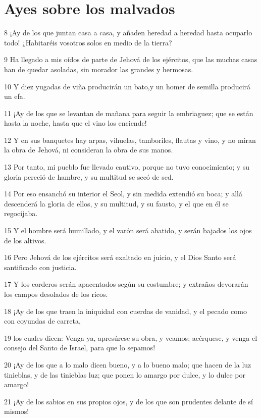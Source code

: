 \section*{Ayes sobre los malvados}

\par 8 ¡Ay de los que juntan casa a casa, y añaden heredad a heredad hasta ocuparlo todo! ¿Habitaréis vosotros solos en medio de la tierra?
\par 9 Ha llegado a mis oídos de parte de Jehová de los ejércitos, que las muchas casas han de quedar asoladas, sin morador las grandes y hermosas.
\par 10 Y diez yugadas de viña producirán un bato,y un homer de semilla producirá un efa.
\par 11 ¡Ay de los que se levantan de mañana para seguir la embriaguez; que se están hasta la noche, hasta que el vino los enciende!
\par 12 Y en sus banquetes hay arpas, vihuelas, tamboriles, flautas y vino, y no miran la obra de Jehová, ni consideran la obra de sus manos.
\par 13 Por tanto, mi pueblo fue llevado cautivo, porque no tuvo conocimiento; y su gloria pereció de hambre, y su multitud se secó de sed.
\par 14 Por eso ensanchó su interior el Seol, y sin medida extendió su boca; y allá descenderá la gloria de ellos, y su multitud, y su fausto, y el que en él se regocijaba.
\par 15 Y el hombre será humillado, y el varón será abatido, y serán bajados los ojos de los altivos.
\par 16 Pero Jehová de los ejércitos será exaltado en juicio, y el Dios Santo será santificado con justicia.
\par 17 Y los corderos serán apacentados según su costumbre; y extraños devorarán los campos desolados de los ricos.
\par 18 ¡Ay de los que traen la iniquidad con cuerdas de vanidad, y el pecado como con coyundas de carreta,
\par 19 los cuales dicen: Venga ya, apresúrese su obra, y veamos; acérquese, y venga el consejo del Santo de Israel, para que lo sepamos!
\par 20 ¡Ay de los que a lo malo dicen bueno, y a lo bueno malo; que hacen de la luz tinieblas, y de las tinieblas luz; que ponen lo amargo por dulce, y lo dulce por amargo!
\par 21 ¡Ay de los sabios en sus propios ojos, y de los que son prudentes delante de sí mismos!
